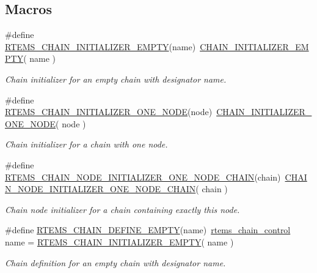 \subsection*{Macros}
\begin{DoxyCompactItemize}
\item 
\mbox{\label{group__ClassicChains_ga80bc08386f6d9ab267580b4ccb46cc19}} 
\#define \mbox{\hyperlink{group__ClassicChains_ga80bc08386f6d9ab267580b4ccb46cc19}{R\+T\+E\+M\+S\+\_\+\+C\+H\+A\+I\+N\+\_\+\+I\+N\+I\+T\+I\+A\+L\+I\+Z\+E\+R\+\_\+\+E\+M\+P\+TY}}(name)~\mbox{\hyperlink{group__RTEMSScoreChain_ga837c307db69277bfb97d3ed4c22bc420}{C\+H\+A\+I\+N\+\_\+\+I\+N\+I\+T\+I\+A\+L\+I\+Z\+E\+R\+\_\+\+E\+M\+P\+TY}}( name )
\begin{DoxyCompactList}\small\item\em Chain initializer for an empty chain with designator {\itshape name}. \end{DoxyCompactList}\item 
\#define \mbox{\hyperlink{group__ClassicChains_gaa05397b51bc03203b87a1946ba1e704a}{R\+T\+E\+M\+S\+\_\+\+C\+H\+A\+I\+N\+\_\+\+I\+N\+I\+T\+I\+A\+L\+I\+Z\+E\+R\+\_\+\+O\+N\+E\+\_\+\+N\+O\+DE}}(node)~\mbox{\hyperlink{group__RTEMSScoreChain_ga7a5473b2ce45742e83c906284e21bd90}{C\+H\+A\+I\+N\+\_\+\+I\+N\+I\+T\+I\+A\+L\+I\+Z\+E\+R\+\_\+\+O\+N\+E\+\_\+\+N\+O\+DE}}( node )
\begin{DoxyCompactList}\small\item\em Chain initializer for a chain with one {\itshape node}. \end{DoxyCompactList}\item 
\#define \mbox{\hyperlink{group__ClassicChains_gae867af63c6f18251ec2c566c0bc7ed71}{R\+T\+E\+M\+S\+\_\+\+C\+H\+A\+I\+N\+\_\+\+N\+O\+D\+E\+\_\+\+I\+N\+I\+T\+I\+A\+L\+I\+Z\+E\+R\+\_\+\+O\+N\+E\+\_\+\+N\+O\+D\+E\+\_\+\+C\+H\+A\+IN}}(chain)~\mbox{\hyperlink{group__RTEMSScoreChain_ga1d87ba1964e8793cb2f399c7a36b0e06}{C\+H\+A\+I\+N\+\_\+\+N\+O\+D\+E\+\_\+\+I\+N\+I\+T\+I\+A\+L\+I\+Z\+E\+R\+\_\+\+O\+N\+E\+\_\+\+N\+O\+D\+E\+\_\+\+C\+H\+A\+IN}}( chain )
\begin{DoxyCompactList}\small\item\em Chain node initializer for a {\itshape chain} containing exactly this node. \end{DoxyCompactList}\item 
\mbox{\label{group__ClassicChains_ga36c6f609724fd4e2e22867e89cd0e535}} 
\#define \mbox{\hyperlink{group__ClassicChains_ga36c6f609724fd4e2e22867e89cd0e535}{R\+T\+E\+M\+S\+\_\+\+C\+H\+A\+I\+N\+\_\+\+D\+E\+F\+I\+N\+E\+\_\+\+E\+M\+P\+TY}}(name)~\mbox{\hyperlink{unionChain__Control}{rtems\+\_\+chain\+\_\+control}} name = \mbox{\hyperlink{group__ClassicChains_ga80bc08386f6d9ab267580b4ccb46cc19}{R\+T\+E\+M\+S\+\_\+\+C\+H\+A\+I\+N\+\_\+\+I\+N\+I\+T\+I\+A\+L\+I\+Z\+E\+R\+\_\+\+E\+M\+P\+TY}}( name )
\begin{DoxyCompactList}\small\item\em Chain definition for an empty chain with designator {\itshape name}. \end{DoxyCompactList}\end{DoxyCompactItemize}
